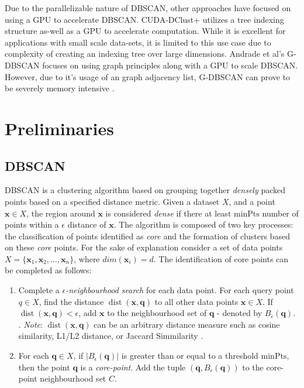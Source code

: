 \documentclass{article}
\newcommand{\bq}{\mathbf{q}}
\newcommand{\bx}{\mathbf{x}}
\newcommand{\eps}{\epsilon}
\newcommand{\Bq}{B_{\eps}(\bq)}
\newcommand{\dist}{\operatorname{dist}}
\begin{document}
Due to the parallelizable nature of DBSCAN, other approaches \cite{andrade_g-dbscan_2013, poudel_cuda-dclust_2021, thapa_memory-efficient_2010} have focused on using a GPU to accelerate DBSCAN. CUDA-DClust+ \cite{poudel_cuda-dclust_2021} utilizes a tree indexing structure as-well as a GPU to accelerate computation. While it is excellent for applications with small scale data-sets, it is limited to this use case due to complexity of creating an indexing tree over large dimensions. Andrade et al's G-DBSCAN \cite{andrade_g-dbscan_2013} focuses on using graph principles along with a GPU to scale DBSCAN. However, due to it's usage of an graph adjacency list, G-DBSCAN can prove to be severely memory intensive \cite{mustafa_experimental_2019}. 


\section{Preliminaries}

\subsection{DBSCAN}
DBSCAN \cite{DBSCAN} is a clustering algorithm based on grouping together \textit{densely} packed points based on a specified distance metric. Given a dataset $X$, and a point $\bx \in X$, the region around $\bx$ is considered \textit{dense} if there at least $\text{minPts}$ number of points within a $\eps$ distance of $\bx$. The algorithm is composed of two key processes: the classification of points identified as \textit{core} and the formation of clusters based on these \textit{core} points. For the sake of explanation consider a set of data points $X = \{\bx_1, \bx_2, \dots, \bx_n\}$, where $\textit{dim}(\bx_i) = d$. The identification of core points can be completed as follows:

\begin{enumerate}
	\item Complete a \textit{$\eps$-neighbourhood search} for each data point. For each query point $q \in X$, find the distance  $\dist(\bx, \bq)$  to all other data points $\bx \in X$. If $\dist(\bx, \bq) < \eps$, add $\bx$ to the neighbourhood set of $\bq$ - denoted by $\Bq$. . \textit{Note}: $\dist(\bx, \bq)$ can be an arbitrary distance measure \cite{DBSCAN_REVISITED} such as cosine similarity, L1/L2 distance, or Jaccard Simmilarity \cite{KANNAN201663}.
	\item For each $\bq \in X$, if $|\Bq|$ is greater than or equal to a threshold $\text{minPts}$, then the point $\bq$ is a \textit{core-point}. Add the tuple $(\bq, \Bq)$ to the core-point neighbourhood set $C$.
\end{enumerate}
\end{document}

